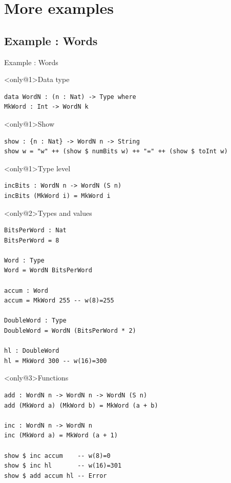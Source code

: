 \documentclass{beamer}
\begin{document}
	
	\section{More examples}
	\subsection{Example : Words}
	\begin{frame}[fragile]{Example : Words}
		
		\begin{block}<only@1>{Data type}
			\begin{lstlisting}[basicstyle=\ttfamily\scriptsize]
data WordN : (n : Nat) -> Type where
MkWord : Int -> WordN k
			\end{lstlisting}
		\end{block}
		\begin{block}<only@1>{Show}
		\begin{lstlisting}[basicstyle=\ttfamily\scriptsize]
show : {n : Nat} -> WordN n -> String
show w = "w" ++ (show $ numBits w) ++ "=" ++ (show $ toInt w)
			\end{lstlisting}
		\end{block}
		\begin{block}<only@1>{Type level}
			\begin{lstlisting}[basicstyle=\ttfamily\scriptsize]
incBits : WordN n -> WordN (S n)
incBits (MkWord i) = MkWord i
			\end{lstlisting}
		\end{block}
		
		
		\begin{block}<only@2>{Types and values}
			\begin{lstlisting}[basicstyle=\ttfamily\scriptsize]
BitsPerWord : Nat
BitsPerWord = 8
			
Word : Type
Word = WordN BitsPerWord
				
accum : Word
accum = MkWord 255 -- w(8)=255
				
DoubleWord : Type
DoubleWord = WordN (BitsPerWord * 2)
				
hl : DoubleWord
hl = MkWord 300 -- w(16)=300
			\end{lstlisting}
		\end{block}
		
		
		\begin{block}<only@3>{Functions}
			\begin{lstlisting}[basicstyle=\ttfamily\scriptsize]
add : WordN n -> WordN n -> WordN (S n)
add (MkWord a) (MkWord b) = MkWord (a + b)
				
inc : WordN n -> WordN n
inc (MkWord a) = MkWord (a + 1)
				
show $ inc accum	-- w(8)=0
show $ inc hl		-- w(16)=301
show $ add accum hl	-- Error
			\end{lstlisting}
		\end{block}
		
	\end{frame}
	
\end{document}
